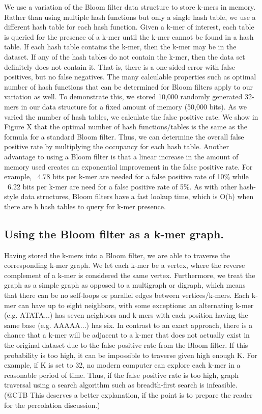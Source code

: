 \documentclass[12pt]{article} \usepackage{simplemargins}
\begin{document}
We use a variation of the Bloom filter data structure to store k-mers
in memory. Rather than using multiple hash functions but only a single
hash table, we use a different hash table for each hash
function. Given a k-mer of interest, each table is queried for the
presence of a k-mer until the k-mer cannot be found in a hash
table. If each hash table contains the k-mer, then the k-mer may
be in the dataset. If any of the hash tables do not contain the
k-mer, then the data set definitely does not contain it. That is, there is a one-sided
error with false positives, but no false negatives. The many
calculable properties such as optimal number of hash functions that
can be determined for Bloom filters apply to our variation as well. To
demonstrate this, we stored 10,000 randomly generated 32-mers in our
data structure for a fixed amount of memory (50,000 bits). As we
varied the number of hash tables, we calculate the false positive
rate. We show in Figure X that the optimal number of hash
functions/tables is the same as the formula for a standard Bloom
filter. Thus, we can determine the overall false positive rate by
multiplying the occupancy for each hash table. Another advantage to
using a Bloom filter is that a linear increase in the amount of memory
used creates an exponential improvement in the false positive
rate. For example, ~4.78 bits per k-mer are needed for a false
positive rate of 10\% while ~6.22 bits per k-mer are need for a false
positive rate of
5\%. As with other hash-style data structures, Bloom filters have a
fast lookup time, which is O(h) when there are h hash tables to query
for k-mer presence.

\subsection{Using the Bloom filter as a k-mer graph.}
Having stored the k-mers into a Bloom filter, we are able to traverse
the corresponding k-mer graph. We let each k-mer be a vertex, where
the reverse complement of a k-mer is considered the same
vertex. Furthermore, we treat the graph as a simple graph as opposed
to a multigraph or digraph, which means that there can be no
self-loops or parallel edges between vertices/k-mers. Each k-mer can
have up to eight neighbors, with some exceptions: an alternating k-mer
(e.g. ATATA...) has seven neighbors and k-mers with each position
having the same base (e.g. AAAAA...) has six. In contrast to an exact
approach, there is a chance that a k-mer will be adjacent to a k-mer
that does not actually exist in the original dataset due to the false
positive rate from the Bloom filter. If this probability is too high,
it can be impossible to traverse given high enough K. For example, if
K is set to 32, no modern computer can explore each k-mer in a
reasonable period of time. Thus, if the false positive rate is too
high, graph traversal using a search algorithm such as breadth-first
search is infeasible.  (@CTB This deserves a better explanation, if
the point is to prepare the reader for the percolation discussion.)
\end{document}
